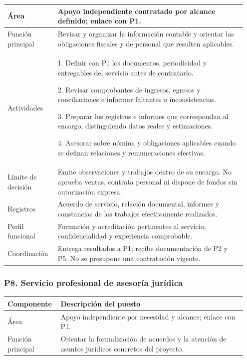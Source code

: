 {\begin{minipage}{\linewidth}
{\begin{tabular}{@{}p{0.20\linewidth}p{0.75\linewidth}@{}}
Área & Apoyo independiente contratado por alcance definido; enlace con P1. \\ \midrule
Función principal & Revisar y organizar la información contable y orientar las obligaciones fiscales y de personal que resulten aplicables. \\ \midrule
Actividades & 1. Definir con P1 los documentos, periodicidad y entregables del servicio antes de contratarlo.\par 2. Revisar comprobantes de ingresos, egresos y conciliaciones e informar faltantes o inconsistencias.\par 3. Preparar los registros e informes que correspondan al encargo, distinguiendo datos reales y estimaciones.\par 4. Asesorar sobre nómina y obligaciones aplicables cuando se definan relaciones y remuneraciones efectivas. \\ \midrule
Límite de decisión & Emite observaciones y trabajos dentro de su encargo. No aprueba ventas, contrata personal ni dispone de fondos sin autorización expresa. \\ \midrule
Registros & Acuerdo de servicio, relación documental, informes y constancias de los trabajos efectivamente realizados. \\ \midrule
Perfil funcional & Formación y acreditación pertinentes al servicio, confidencialidad y experiencia comprobable. \\ \midrule
Coordinación & Entrega resultados a P1; recibe documentación de P2 y P5. No se presupone una contratación vigente. \\ \midrule
\end{tabular}}\end{minipage}\par\medskip
\par\medskip\noindent\begin{minipage}{\linewidth}\subsubsection*{P8. Servicio profesional de asesoría jurídica}
{\small\renewcommand{\arraystretch}{1.15}\begin{tabular}{@{}p{0.20\linewidth}p{0.75\linewidth}@{}}\toprule
\textbf{Componente} & \textbf{Descripción del puesto} \\ \midrule
Área & Apoyo independiente por necesidad y alcance; enlace con P1. \\ \midrule
Función principal & Orientar la formalización de acuerdos y la atención de asuntos jurídicos concretos del proyecto. \\ \midrule

\end{tabular}}
\end{minipage}}
